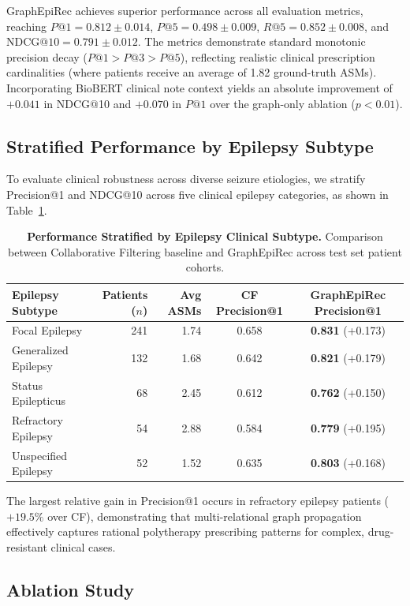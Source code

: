 \documentclass[11pt,a4paper]{article}
\begin{document}
GraphEpiRec achieves superior performance across all evaluation metrics, reaching $P@1 = 0.812 \pm 0.014$, $P@5 = 0.498 \pm 0.009$, $R@5 = 0.852 \pm 0.008$, and $\text{NDCG}@10 = 0.791 \pm 0.012$. The metrics demonstrate standard monotonic precision decay ($P@1 > P@3 > P@5$), reflecting realistic clinical prescription cardinalities (where patients receive an average of 1.82 ground-truth ASMs). Incorporating BioBERT clinical note context yields an absolute improvement of $+0.041$ in NDCG@10 and $+0.070$ in $P@1$ over the graph-only ablation ($p < 0.01$).

\subsection{Stratified Performance by Epilepsy Subtype}
To evaluate clinical robustness across diverse seizure etiologies, we stratify Precision@1 and NDCG@10 across five clinical epilepsy categories, as shown in Table~\ref{tab:stratified}.

\begin{table}[h]
\centering
\caption{\textbf{Performance Stratified by Epilepsy Clinical Subtype.} Comparison between Collaborative Filtering baseline and GraphEpiRec across test set patient cohorts.}
\label{tab:stratified}
\small
\begin{tabular}{lrrcc}
\toprule
\textbf{Epilepsy Subtype} & \textbf{Patients ($n$)} & \textbf{Avg ASMs} & \textbf{CF Precision@1} & \textbf{GraphEpiRec Precision@1} \\
\midrule
Focal Epilepsy & 241 & 1.74 & 0.658 & \textbf{0.831} (+0.173) \\
Generalized Epilepsy & 132 & 1.68 & 0.642 & \textbf{0.821} (+0.179) \\
Status Epilepticus & 68 & 2.45 & 0.612 & \textbf{0.762} (+0.150) \\
Refractory Epilepsy & 54 & 2.88 & 0.584 & \textbf{0.779} (+0.195) \\
Unspecified Epilepsy & 52 & 1.52 & 0.635 & \textbf{0.803} (+0.168) \\
\bottomrule
\end{tabular}
\end{table}

The largest relative gain in Precision@1 occurs in refractory epilepsy patients ($+19.5\%$ over CF), demonstrating that multi-relational graph propagation effectively captures rational polytherapy prescribing patterns for complex, drug-resistant clinical cases.

\subsection{Ablation Study}
\end{document}
